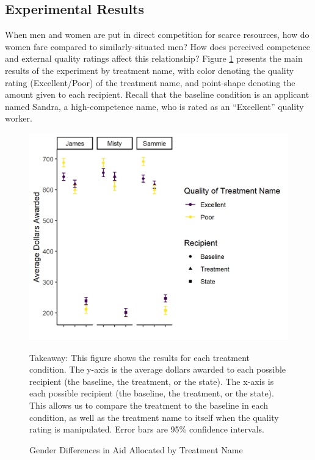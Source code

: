 \documentclass[12pt]{article}%
\begin{document}
\begin{doublespace}
\section*{Experimental Results}
When men and women are put in direct competition for scarce resources, how do women fare compared to similarly-situated men? How does perceived competence and external quality ratings affect this relationship? Figure \ref{results-main} presents the main results of the experiment by treatment name, with color denoting the quality rating (Excellent/Poor) of the treatment name, and point-shape denoting the amount given to each recipient. Recall that the baseline condition is an applicant named Sandra, a high-competence name, who is rated as an ``Excellent” quality worker.

\begin{figure}[h!]
	\centering
	\includegraphics[scale=1]{figs/general-results-name.png}
	{\singlespacing
		\parbox{0.75\textwidth}{\scriptsize%
			Takeaway: This figure shows the results for each treatment condition. The y-axis is the average dollars awarded to each possible recipient (the baseline, the treatment, or the state). The x-axis is each possible recipient (the baseline, the treatment, or the state). This allows us to compare the treatment to the baseline in each condition, as well as the treatment name to itself when the quality rating is manipulated. Error bars are 95\% confidence intervals.
	}}
	\caption{Gender Differences in Aid Allocated by Treatment Name}
	\label{results-main}
\end{figure}


\end{doublespace}
\end{document}
